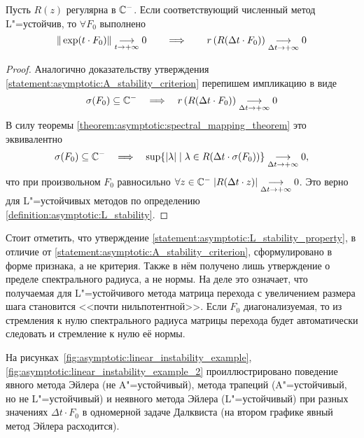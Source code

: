 \begin{statement}
    \label{statement:asymptotic:L_stability_property}
    Пусть $ R(z) $ регулярна в $ \mathbb{C}^- $.
    Если соответствующий численный метод L"=устойчив, то $ \forall F_0 $ выполнено
    \[
        \| \exp(t \cdot F_0) \| \underset{t \to +\infty}{\longrightarrow} 0 \qquad \Longrightarrow \qquad r \left( R(\Delta t \cdot F_0) \right) \underset{\Delta t \to +\infty}{\longrightarrow} 0
    \]
\end{statement}

\begin{proof}
    Аналогично доказательству утверждения \ref{statement:asymptotic:A_stability_criterion} перепишем импликацию в виде
    \[
        \sigma(F_0) \subseteq \mathbb{C}^- \quad \Longrightarrow \quad r \left( R(\Delta t \cdot F_0) \right) \underset{\Delta t \to +\infty}{\longrightarrow} 0
    \]
    В силу теоремы \ref{theorem:asymptotic:spectral_mapping_theorem} это эквивалентно
    \[
        \sigma(F_0) \subseteq \mathbb{C}^- \quad \Longrightarrow \quad \sup \{ |\lambda| \mid \lambda \in R(\Delta t \cdot \sigma(F_0)) \} \underset{\Delta t \to +\infty}{\longrightarrow} 0,
    \]
    что при произвольном $ F_0 $ равносильно $ \forall z \in \mathbb{C}^- \; | R(\Delta t \cdot z) | \underset{\Delta t \to +\infty}{\longrightarrow} 0 $.
    Это верно для L"=устойчивых методов по определению \ref{definition:asymptotic:L_stability}.
\end{proof}

Стоит отметить, что утверждение \ref{statement:asymptotic:L_stability_property},
в отличие от \ref{statement:asymptotic:A_stability_criterion},
сформулировано в форме признака, а не критерия.
Также в нём получено лишь утверждение о пределе спектрального радиуса, а не нормы.
На деле это означает, что получаемая для L"=устойчивого метода матрица перехода
с увеличением размера шага становится <<почти нильпотентной>>.
Если $ F_0 $ диагонализуемая, то из стремления к нулю спектрального радиуса матрицы перехода
будет автоматически следовать и стремление к нулю её нормы.

На рисунках~\ref{fig:asymptotic:linear_instability_example},
\ref{fig:asymptotic:linear_instability_example_2}
проиллюстрировано поведение явного метода Эйлера (не A"=устойчивый),
метода трапеций (A"=устойчивый, но не L"=устойчивый)
и неявного метода Эйлера (L"=устойчивый) при разных значениях $ \Delta t \cdot F_0 $ в одномерной задаче Далквиста
(на втором графике явный метод Эйлера расходится).

